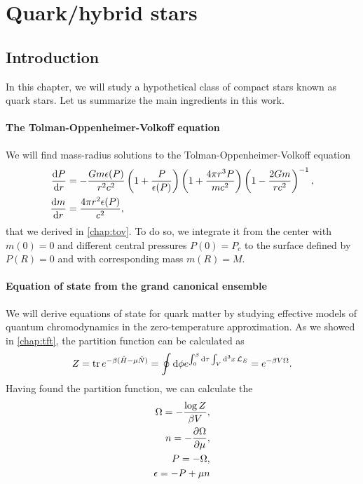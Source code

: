 \chapter{Quark/hybrid stars}

\section{Introduction}


In this chapter, we will study a hypothetical class of compact stars known as quark stars.
Let us summarize the main ingredients in this work.

\subsubsection{The Tolman-Oppenheimer-Volkoff equation}

We will find mass-radius solutions to the Tolman-Oppenheimer-Volkoff equation
\begin{subequations}
\begin{align}
	\odv{P}{r} &= -\frac{G m \epsilon(P)}{r^2 c^2} \left( 1 + \frac{P}{\epsilon(P)} \right) \left( 1 + \frac{4 \pi r^3 P}{m c^2} \right) \left( 1 - \frac{2 G m}{r c^2} \right)^{-1} , \\
	\odv{m}{r} &= \frac{4 \pi r^2 \epsilon(P)}{c^2} ,
\end{align}
\end{subequations}
that we derived in \cref{chap:tov}.
To do so, we integrate it from the center with $m(0) = 0$ and different central pressures $P(0) = P_c$ to the surface defined by $P(R) = 0$ and with corresponding mass $m(R) = M$.

\subsubsection{Equation of state from the grand canonical ensemble}

We will derive equations of state for quark matter by studying effective models of quantum chromodynamics in the zero-temperature approximation.
As we showed in \cref{chap:tft}, the partition function can be calculated as
\begin{equation}
	Z = \operatorname{tr} e^{-\beta (\hat{H} - \mu \hat{N})} = \oint \mathop{}\!\mathrm{d} \phi e^{\int_0^\beta \mathop{}\!\mathrm{d} \tau \int_V \mathop{}\!\mathrm{d}^3 x \, \mathcal{L}_E } = e^{-\beta V \Omega} .
\end{equation}
Having found the partition function, we can calculate the
\begin{align}
	\Omega = -\frac{\log Z}{\beta V}, \\
	n = -\pdv{\Omega}{\mu}, \\
	P = -\Omega, \\
	\epsilon = -P + \mu n
\end{align}

